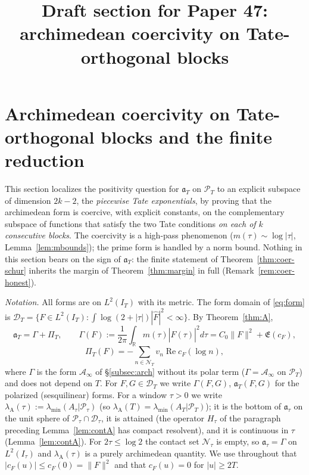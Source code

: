 \documentclass[11pt]{amsart}
\theoremstyle{definition}
\theoremstyle{remark}
\newcommand{\R}{\mathbb R}
\newcommand{\Rel}{\operatorname{Re}}
\newcommand{\PT}{\mathcal P_T}
\newcommand{\IT}{I_T}
\newcommand{\lamA}{\lambda_{\min}(A_T|\PT)}
\newcommand{\Fh}{\widehat F}
\newcommand{\cF}{c_F}
\newcommand{\Lev}{\mathfrak E}
\newcommand{\NT}{\mathcal N_T}
\newcommand{\Ainf}{\mathcal A_\infty}
\newcommand{\PiT}{\Pi_T}
\begin{document}
\title{Draft section for Paper 47: archimedean coercivity on Tate-orthogonal blocks}
\maketitle
\fi

\section{Archimedean coercivity on Tate-orthogonal blocks and the finite reduction}\label{sec:coer}

This section localizes the positivity question for $\mathfrak a_T$ on $\PT$ to an explicit
subspace of dimension $2k-2$, the \emph{piecewise Tate exponentials}, by proving that the
archimedean form is coercive, with explicit constants, on the complementary subspace of functions
that satisfy the two Tate conditions \emph{on each of $k$ consecutive blocks}. The coercivity is a
high-pass phenomenon ($m(\tau)\sim\log|\tau|$, Lemma~\ref{lem:mbounds}); the prime form is handled
by a norm bound. Nothing in this section bears on the sign of $\mathfrak a_T$: the finite statement
of Theorem~\ref{thm:coer-schur} inherits the margin of Theorem~\ref{thm:margin} in full
(Remark~\ref{rem:coer-honest}).

\emph{Notation.} All forms are on $L^2(\IT)$ with its metric. The form domain of \eqref{eq:form} is
$\mathcal D_T=\{F\in L^2(\IT):\int\log(2+|\tau|)|\Fh|^2<\infty\}$. By Theorem~\ref{thm:A},
\[
\mathfrak a_T=\Gamma+\PiT,\qquad
\Gamma(F):=\frac1{2\pi}\int_\R m(\tau)|\Fh(\tau)|^2d\tau=C_0\|F\|^2+\Lev(\cF),
\]
\[
\PiT(F)=-\sum_{n\in\NT}v_n\Rel\cF(\log n),
\]
where $\Gamma$ is the form $\Ainf$ of \S\ref{subsec:arch} without its polar term ($\Gamma=\Ainf$ on
$\PT$) and does not depend on $T$. For $F,G\in\mathcal D_T$ we write $\Gamma(F,G)$,
$\mathfrak a_T(F,G)$ for the polarized (sesquilinear) forms. For a window $\tau>0$ we write
$\lambda_{\mathrm A}(\tau):=\lambda_{\min}(A_\tau|\mathcal P_\tau)$ (so $\lambda_{\mathrm A}(T)=\lamA$);
it is the bottom of $\mathfrak a_\tau$ on the unit sphere of $\mathcal P_\tau\cap\mathcal D_\tau$, it is
attained (the operator $H_\tau$ of the paragraph preceding Lemma~\ref{lem:contA} has compact
resolvent), and it is continuous in $\tau$ (Lemma~\ref{lem:contA}). For $2\tau\le\log2$ the contact
set $\mathcal N_\tau$ is empty, so $\mathfrak a_\tau=\Gamma$ on $L^2(I_\tau)$ and
$\lambda_{\mathrm A}(\tau)$ is a purely archimedean quantity. We use throughout that
$|\cF(u)|\le\cF(0)=\|F\|^2$ and that $\cF(u)=0$ for $|u|\ge2T$.
\end{document}
